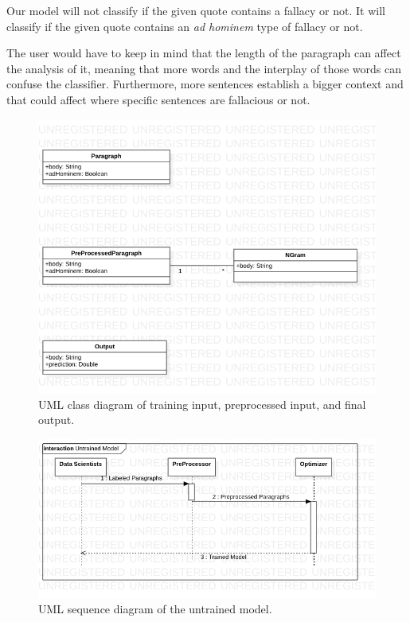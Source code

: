 \documentclass[a4paper]{article}
\begin{document}
Our model will not classify if the given quote contains a fallacy or not. It will classify if the given quote contains an \emph{ad hominem} type of fallacy or not.

The user would have to keep in mind that the length of the paragraph can affect the analysis of it, meaning that more words and the interplay of those words can confuse the classifier. Furthermore, more sentences establish a bigger context and that could affect where specific sentences are fallacious or not.

\begin{figure}
    \includegraphics[width=1\textwidth]{figures/png/Model!Main_0.png}
    \caption{UML class diagram of training input, preprocessed input, and final output.}
    \label{fig:class-diagram}
\end{figure}

\begin{figure}
    \includegraphics[width=1\textwidth]{figures/png/Collaboration2!Interaction1!UntrainedModel_2.png}
    \caption{UML sequence diagram of the untrained model.}
    \label{fig:untrained-diagram}
\end{figure}
\end{document}
